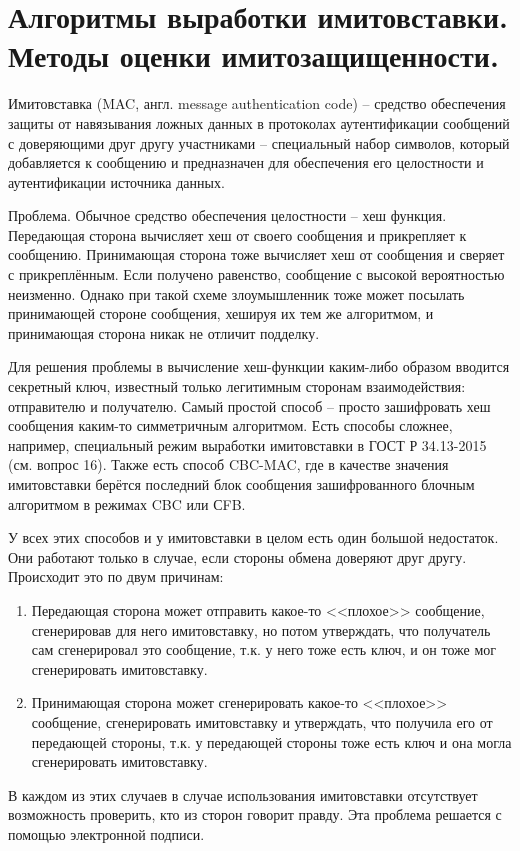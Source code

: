 \section{Алгоритмы выработки имитовставки. Методы оценки имитозащищенности.}

Имитовставка (MAC, англ. message authentication code) -- средство обеспечения защиты от навязывания ложных данных в протоколах аутентификации сообщений с доверяющими друг другу участниками -- специальный набор символов, который добавляется к сообщению и предназначен для обеспечения его целостности и аутентификации источника данных.

Проблема. Обычное средство обеспечения целостности -- хеш функция. Передающая сторона вычисляет хеш от своего сообщения и прикрепляет к сообщению. Принимающая сторона тоже вычисляет хеш от сообщения и сверяет с прикреплённым. Если получено равенство, сообщение с высокой вероятностью неизменно. Однако при такой схеме злоумышленник тоже может посылать принимающей стороне сообщения, хешируя их тем же алгоритмом, и принимающая сторона никак не отличит подделку. 

Для решения проблемы в вычисление хеш-функции каким-либо образом вводится секретный ключ, известный только легитимным сторонам взаимодействия: отправителю и получателю. Самый простой способ -- просто зашифровать хеш сообщения каким-то симметричным алгоритмом. Есть способы сложнее, например, специальный режим выработки имитовставки в ГОСТ Р 34.13-2015 (см. вопрос 16). Также есть способ CBC-MAC, где в качестве значения имитовставки берётся последний блок сообщения зашифрованного блочным алгоритмом в режимах CBC или СFB.

У всех этих способов и у имитовставки в целом есть один большой недостаток. Они работают только в случае, если стороны обмена доверяют друг другу. Происходит это по двум причинам:

\begin{enumerate}
	\item Передающая сторона может отправить какое-то <<плохое>> сообщение, сгенерировав для него имитовставку, но потом утверждать, что получатель сам сгенерировал это сообщение, т.к. у него тоже есть ключ, и он тоже мог сгенерировать имитовставку.
	\item Принимающая сторона может сгенерировать какое-то <<плохое>> сообщение, сгенерировать имитовставку и утверждать, что получила его от передающей стороны, т.к. у передающей стороны тоже есть ключ и она могла сгенерировать имитовставку.
\end{enumerate}

В каждом из этих случаев в случае использования имитовставки отсутствует возможность проверить, кто из сторон говорит правду. Эта проблема решается с помощью электронной подписи. 